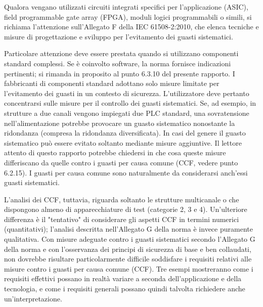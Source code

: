 \begin{center}
    \begin{minipage}{\textwidth}
        \centering
        \captionsetup{hypcap=false}
        \resizebox{\textwidth}{!}{}
        \label{fig:06-04}
    \end{minipage}
\end{center}

Qualora vengano utilizzati circuiti integrati specifici per l'applicazione (ASIC), field programmable gate array (FPGA), moduli logici programmabili o simili, si richiama l'attenzione sull'Allegato F della IEC 61508-2:2010, che elenca tecniche e misure di progettazione e sviluppo per l'evitamento dei guasti sistematici.

Particolare attenzione deve essere prestata quando si utilizzano componenti standard complessi. Se è coinvolto software, la norma fornisce indicazioni pertinenti; si rimanda in proposito al punto 6.3.10 del presente rapporto. I fabbricanti di componenti standard adottano solo misure limitate per l'evitamento dei guasti in un contesto di sicurezza. L'utilizzatore deve pertanto concentrarsi sulle misure per il controllo dei guasti sistematici. Se, ad esempio, in strutture a due canali vengono impiegati due PLC standard, una sovratensione nell'alimentazione potrebbe provocare un guasto sistematico nonostante la ridondanza (compresa la ridondanza diversificata). In casi del genere il guasto sistematico può essere evitato soltanto mediante misure aggiuntive. Il lettore attento di questo rapporto potrebbe chiedersi in che cosa queste misure differiscano da quelle contro i guasti per causa comune (CCF, vedere punto 6.2.15). I guasti per causa comune sono naturalmente da considerarsi anch'essi guasti sistematici. 

L'analisi dei CCF, tuttavia, riguarda soltanto le strutture multicanale o che dispongono almeno di apparecchiature di test (categorie 2, 3 e 4). Un'ulteriore differenza è il "tentativo" di considerare gli aspetti CCF in termini numerici (quantitativi); l'analisi descritta nell'Allegato G della norma è invece puramente qualitativa. Con misure adeguate contro i guasti sistematici secondo l'Allegato G della norma e con l'osservanza dei principi di sicurezza di base e ben collaudati, non dovrebbe risultare particolarmente difficile soddisfare i requisiti relativi alle misure contro i guasti per causa comune (CCF).
Tre esempi mostreranno come i requisiti effettivi possano in realtà variare a seconda dell'applicazione e della tecnologia, e come i requisiti generali possano quindi talvolta richiedere anche un'interpretazione.

